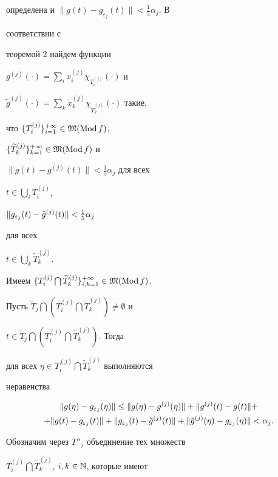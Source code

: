 \begin{pf}
определена и $\|g(t)-g_{\varepsilon_j}(t)\|<\frac{1}{5}\alpha_j$. В


соответствии с


теоремой 2 найдем функции


$g^{(j)}(\cdot)=\sum\limits_i x^{(j)}_i\chi_{T^{(j)}_i}(\cdot)$ и


$\tilde g^{(j)}(\cdot)=


\sum\limits_k\tilde x^{(j)}_k\chi_{\widetilde T^{(j)}_k}(\cdot)$ такие,


что $\{T^{(j)}_i\}^{+\infty}_{i=1}\in\frak M(\operatorname{Mod} f)$,


$\{\widetilde T^{(j)}_k\}^{+\infty}_{k=1}\in\frak M(\operatorname{Mod} f)$ и


$\|g(t)-g^{(j)}(t)\|<\frac{1}{5}\alpha_j$ для всех


$t\in\bigcup\limits_i T^{(j)}_i$,


$\|g_{\varepsilon_j}(t)-\Tilde g^{(j)}(t)\|<\frac{1}{5}\alpha_j$


для всех


$t\in\bigcup\limits_k\widetilde T^{(j)}_k$.


Имеем $\{T^{(j)}_i\bigcap\widetilde T^{(j)}_k\}^{+\infty}_{i,k=1}\in


\frak M(\Mod f)$.


Пусть $\widetilde T_j\bigcap\left(T^{(j)}_i\bigcap\widetilde


T^{(j)}_k\right)\ne\emptyset$ и


$t\in\widetilde T_j\bigcap\left(T^{(j)}_i\bigcap\widetilde


T^{(j)}_k\right)$. Тогда


для всех $\eta\in T^{(j)}_i\bigcap\widetilde T^{(j)}_k$ выполняются


неравенства


\begin{multline*}


\|g(\eta)-g_{\varepsilon_j}(\eta)\|\le \|g(\eta)-g^{(j)}(\eta)\|+


\|g^{(j)}(t)-g(t)\|+ \\


+\|g(t)-g_{\varepsilon_j}(t)\|+\|g_{\varepsilon_j}(t)-


\Tilde g^{(j)}(t)\|+\|\Tilde g^{(j)}(\eta)-


g_{\varepsilon_j}(\eta)\|<\alpha_j.


\end{multline*}


Обозначим через $T''_j$ объединение тех множеств


$T^{(j)}_i\bigcap\widetilde T^{(j)}_k$, $i,k\in\Bbb N$, которые имеют



\end{pf}
